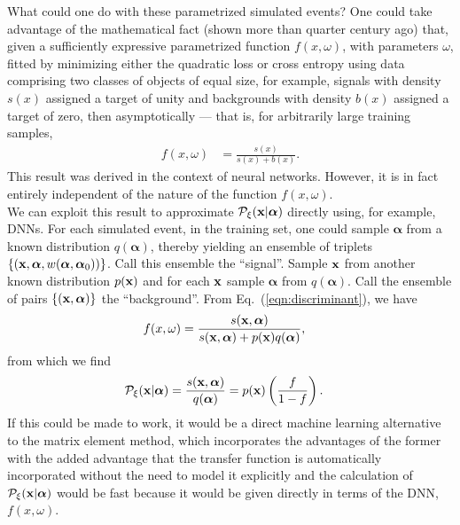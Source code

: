 What could one do with these parametrized simulated events? One could take advantage of the mathematical fact (shown more than quarter century ago) that, given a sufficiently expressive parametrized function $f(x, \omega)$, with parameters $\omega$, fitted by minimizing either the quadratic loss or cross entropy using data comprising two classes of objects of equal size, for example, signals with density $s(x)$ assigned a target of unity and backgrounds with density $b(x)$ assigned a target of zero, then asymptotically --- that is, for arbitrarily large training samples,
\begin{align}
 f(x, \omega) & = \frac{s(x)}{s(x) + b(x)}.
 \label{eqn:discriminant}
\end{align}
This result was derived in the context of neural networks. However, it is in fact entirely independent of the nature of the function
$f(x, \omega)$.\\

We can exploit this result to approximate $\mathcal{P}_{\xi}({\bf x}|{\boldsymbol\alpha})$ directly using, for example, DNNs. For each simulated event, in the training set, one could sample $\boldsymbol{\alpha}$ from a known distribution $q(\boldsymbol{\alpha})$, thereby yielding an ensemble of triplets $\{ ({\bf x}, \boldsymbol{\alpha}, w(\boldsymbol{\alpha}, \boldsymbol{\alpha}_0)) \}$. Call this ensemble the ``signal''.
Sample ${\bf x}$ from another known distribution $p({\bf x})$ and for each ${\bf x}$ sample $\boldsymbol{\alpha}$ from $q(\boldsymbol{\alpha})$. Call the ensemble of pairs $\{({\bf x}, \boldsymbol{\alpha})\}$ the ``background''.
From Eq.~(\ref{eqn:discriminant}), we have
\begin{align}
 f(x, \omega) & = \frac{s({\bf x}, \boldsymbol{\alpha})}{s({\bf x}, \boldsymbol{\alpha}) + p({\bf x}) q(\boldsymbol{\alpha})},
\end{align}
from which we find
\begin{align}
 \mathcal{P}_{\xi}({\bf x}|{\boldsymbol\alpha}) & = \frac{s({\bf x}, {\boldsymbol\alpha})}{q(\boldsymbol{\alpha})} = p({\bf x}) \left( \frac{f}{1 - f} \right).
\end{align}
If this could be made to work, it would be a direct machine learning alternative to the matrix element method, which incorporates the advantages of the former with the added advantage that the transfer function is automatically incorporated without the need to model it explicitly and the calculation of $\mathcal{P}_{\xi}({\bf x}|{\boldsymbol\alpha})$ would be fast because it would be given directly in terms of the DNN, $f(x, \omega)$.

